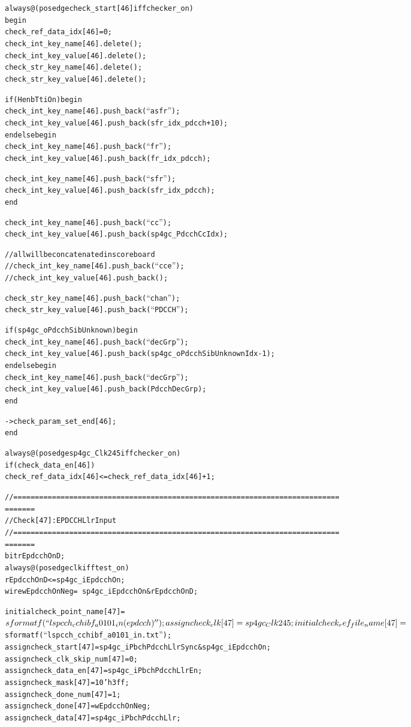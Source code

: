 \documentclass{note}
\begin{document}
\begin{alltt}
  always@(posedge check_start[46] iff checker_on)
  begin
    check_ref_data_idx[46] = 0;
    check_int_key_name[46].delete();
    check_int_key_value[46].delete();
    check_str_key_name[46].delete();
    check_str_key_value[46].delete();

    if (HenbTtiOn) begin
      check_int_key_name[46].push_back(``asfr'');
      check_int_key_value[46].push_back(sfr_idx_pdcch+10);
    end else begin
      check_int_key_name[46].push_back(``fr'');
      check_int_key_value[46].push_back(fr_idx_pdcch);

      check_int_key_name[46].push_back(``sfr'');
      check_int_key_value[46].push_back(sfr_idx_pdcch);
    end

    check_int_key_name[46].push_back(``cc'');
    check_int_key_value[46].push_back(sp4gc_PdcchCcIdx);

    // all will be concatenated in scoreboard
    // check_int_key_name[46].push_back(``cce'');
    // check_int_key_value[46].push_back();

    check_str_key_name[46].push_back(``chan'');
    check_str_key_value[46].push_back(``PDCCH'');

    if (sp4gc_oPdcchSibUnknown) begin
      check_int_key_name[46].push_back(``decGrp'');
      check_int_key_value[46].push_back(sp4gc_oPdcchSibUnknownIdx-1);
    end else begin
      check_int_key_name[46].push_back(``decGrp'');
      check_int_key_value[46].push_back(PdcchDecGrp);
    end

    ->check_param_set_end[46];
  end

  always@(posedge sp4gc_Clk245 iff checker_on)
    if(check_data_en[46])
      check_ref_data_idx[46] <= check_ref_data_idx[46]+1;

  //============================================================================
=======
  // Check [47] : EPDCCH Llr Input
  //============================================================================
=======
  bit rEpdcchOnD;
  always @ (posedge clk iff test_on)
    rEpdcchOnD <= sp4gc_iEpdcchOn;
  wire wEpdcchOnNeg = ~sp4gc_iEpdcchOn&rEpdcchOnD;

  initial check_point_name[47]     = $sformatf(``lspcch_cchibf_a0101_in (epdcch)''
);
  assign  check_clk[47]            = sp4gc_Clk245;
  initial check_ref_file_name[47]  = $sformatf(``lspcch_cchibf_a0101_in.txt'');
  assign  check_start[47]          = sp4gc_iPbchPdcchLlrSync&sp4gc_iEpdcchOn;
  assign  check_clk_skip_num[47]   = 0;
  assign  check_data_en[47]        = sp4gc_iPbchPdcchLlrEn;
  assign  check_mask[47]           = 10'h3ff;
  assign  check_done_num[47]       = 1;
  assign  check_done[47]           = wEpdcchOnNeg;
  assign  check_data[47]           = sp4gc_iPbchPdcchLlr;


\end{alltt}
\end{document}
